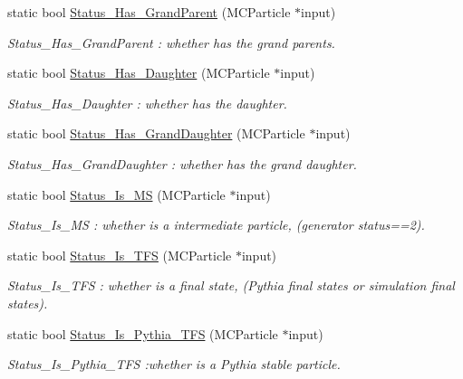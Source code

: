 \begin{DoxyCompactItemize}
static bool \hyperlink{classToolSet_1_1CMC_a88ff52dd7c66369b43eb8619a1383e7d}{Status\_\-Has\_\-GrandParent} (MCParticle $\ast$input)
\begin{DoxyCompactList}\small\item\em Status\_\-Has\_\-GrandParent : whether has the grand parents. \item\end{DoxyCompactList}\item 
static bool \hyperlink{classToolSet_1_1CMC_a1771a4a8936446f9dfe5f9d22b5d9322}{Status\_\-Has\_\-Daughter} (MCParticle $\ast$input)
\begin{DoxyCompactList}\small\item\em Status\_\-Has\_\-Daughter : whether has the daughter. \item\end{DoxyCompactList}\item 
static bool \hyperlink{classToolSet_1_1CMC_a79d54fb4529c17a59ab21a51b3f6889c}{Status\_\-Has\_\-GrandDaughter} (MCParticle $\ast$input)
\begin{DoxyCompactList}\small\item\em Status\_\-Has\_\-GrandDaughter : whether has the grand daughter. \item\end{DoxyCompactList}\item 
static bool \hyperlink{classToolSet_1_1CMC_ae0ceba81f34f1a164b1d8ce719c92e05}{Status\_\-Is\_\-MS} (MCParticle $\ast$input)
\begin{DoxyCompactList}\small\item\em Status\_\-Is\_\-MS : whether is a intermediate particle, (generator status==2). \item\end{DoxyCompactList}\item 
static bool \hyperlink{classToolSet_1_1CMC_a662c5f9d64c7916f988e4ff15598d4ed}{Status\_\-Is\_\-TFS} (MCParticle $\ast$input)
\begin{DoxyCompactList}\small\item\em Status\_\-Is\_\-TFS : whether is a final state, (Pythia final states or simulation final states). \item\end{DoxyCompactList}\item 
static bool \hyperlink{classToolSet_1_1CMC_aef5a206838a69936e98ea22a1c36e143}{Status\_\-Is\_\-Pythia\_\-TFS} (MCParticle $\ast$input)
\begin{DoxyCompactList}\small\item\em Status\_\-Is\_\-Pythia\_\-TFS :whether is a Pythia stable particle. \item\end{DoxyCompactList}\item 

\end{DoxyCompactItemize}
